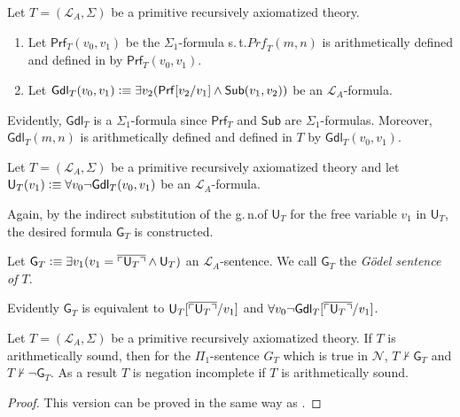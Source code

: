 \begin{dfn}
Let $T = ( \mathcal{L}_A, \Sigma)$ be a primitive recursively axiomatized theory.
\begin{enumerate}
\item Let $\mathsf{Prf}_T(v_0,v_1)$ be the $\Sigma_1$-formula s.\,t.\@ $\mathit{Prf}_T(m,n)$ is arithmetically defined and defined in \PA by $\mathsf{Prf}_T(v_0,v_1)$.
\item Let $\mathsf{Gdl}_T(v_0, v_1) \vcentcolon \equiv \exists v_2 ( \mathsf{Prf}[v_2/v_1] \wedge \mathsf{Sub}(v_1, v_2))$ be an $\mathcal{L}_A$-formula. 
\end{enumerate}
\end{dfn}
Evidently, $\mathsf{Gdl}_T$ is a $\Sigma_1$-formula since $\mathsf{Prf}_T$ and $\mathsf{Sub}$ are $\Sigma_1$-formulas. Moreover, $\mathsf{Gdl}_T(m,n)$ is arithmetically defined and defined in $T$ by $\mathsf{Gdl}_T(v_0,v_1)$.

\begin{dfn}
Let $T = ( \mathcal{L}_A, \Sigma)$ be a primitive recursively axiomatized theory and let $\mathsf{U}_T(v_1) \vcentcolon \equiv \forall v_0  \lnot \mathsf{Gdl}_T(v_0,v_1)$ be an $\mathcal{L}_A$-formula.
\end{dfn}

Again, by the indirect substitution of the g.\,n.\@ of $\mathsf{U}_T$ for the free variable $v_1$ in $\mathsf{U}_T$, the desired formula $\mathsf{G}_T$ is constructed. 
\begin{dfn}
Let $\mathsf{G}_T \vcentcolon \equiv \exists v_1 (v_1 = \overline{\ulcorner \mathsf{U}_T \urcorner} \wedge\mathsf{ U}_T)$ an $\mathcal{L}_A$-sentence. We call $\mathsf{G}_T$ the \textit{G\"odel sentence of $T$}.
\end{dfn}

Evidently $\mathsf{G}_T$ is equivalent to $\mathsf{U}_T[\overline{\ulcorner \mathsf{U}_T \urcorner }/v_1]$ and $\forall v_0  \lnot \mathsf{Gdl}_T[\overline{\ulcorner \mathsf{U}_T \urcorner }/v_1 ]$.
 
\begin{thm}\label{thm:gensemfirst}
Let $T = (\mathcal{L}_A, \Sigma)$ be a primitive recursively axiomatized theory. If $T$ is arithmetically sound, then for the $\Pi_1$-sentence $G_T$ which is true in $\mathcal{N}$, $T \nvdash \mathsf{G}_T$ and $T \nvdash \lnot \mathsf{G}_T$. As a result $T$ is negation incomplete if $T$ is arithmetically sound.
\end{thm}

\begin{proof}
This version can be proved in the same way as . 
\end{proof}

